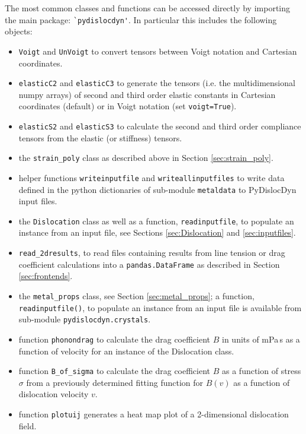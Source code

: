 \documentclass[11pt,letterpaper,oneside,pdftex]{article}
\begin{document}
The most common classes and functions can be accessed directly by importing the main package: \verb|`pydislocdyn'|.
In particular this includes the following objects:
\begin{itemize}
	\item \verb|Voigt| and \verb|UnVoigt| to convert tensors between Voigt notation and Cartesian coordinates.
	\item \verb|elasticC2| and \verb|elasticC3| to generate the tensors (i.e. the multidimensional numpy arrays) of second and third order elastic constants in Cartesian coordinates (default) or in Voigt notation (set \verb|voigt=True|).
	\item \verb|elasticS2| and \verb|elasticS3| to calculate the second and third order compliance tensors from the elastic (or stiffness) tensors.
	\item the \verb|strain_poly| class as described above in Section \ref{sec:strain_poly}.
   \item helper functions \verb|writeinputfile| and \verb|writeallinputfiles|  to write data defined in the python dictionaries of sub-module \verb|metaldata| to PyDislocDyn input files.
   \item  the \verb|Dislocation| class as well as a function, \verb|readinputfile|, to populate an instance from an input file, see Sections \ref{sec:Dislocation} and \ref{sec:inputfiles}.
   \item \verb|read_2dresults|, to read files containing results from line tension or drag coefficient calculations into a \verb|pandas.DataFrame| as described in Section \ref{sec:frontends}.
   \item the \verb|metal_props| class, see Section \ref{sec:metal_props}; a function, \verb|readinputfile()|, to populate an instance from an input file is available from sub-module \verb|pydislocdyn.crystals|.
   \item function \verb|phonondrag| to calculate the drag coefficient $B$ in units of mPa\,s as a function of velocity for an instance of the Dislocation class.
   \item function \verb|B_of_sigma| to calculate the drag coefficient $B$ as a function of stress $\sigma$ from a previously determined fitting function for $B(v)$ as a function of dislocation velocity $v$.
   \item function \verb|plotuij| generates a heat map plot of a 2-dimensional dislocation field.
\end{itemize}
\end{document}
